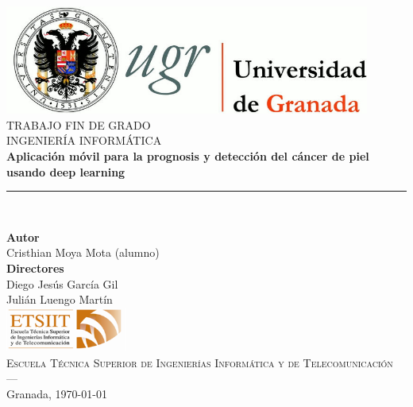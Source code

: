 \begin{titlepage}
 
\newlength{\centeroffset}
\setlength{\centeroffset}{-0.5\oddsidemargin}
\addtolength{\centeroffset}{0.5\evensidemargin}
\thispagestyle{empty}

\noindent\hspace*{\centeroffset}\begin{minipage}{\textwidth}

\centering
\includegraphics[width=0.9\textwidth]{imagenes/logo_ugr.jpg}\\[1.4cm]

\textsc{ \Large TRABAJO FIN DE GRADO\\[0.2cm]}
\textsc{ INGENIERÍA INFORMÁTICA}\\[1cm]
% 
{\Huge\bfseries Aplicación móvil para la prognosis y detección del cáncer de piel usando deep learning\\
}
\noindent\rule[-1ex]{\textwidth}{3pt}\\[3.5ex]
\end{minipage}

\vspace{1cm}
\noindent\hspace*{\centeroffset}\begin{minipage}{\textwidth}
\centering

\textbf{Autor}\\ {Cristhian Moya Mota (alumno)}\\[2ex]
\textbf{Directores}\\
Diego Jesús García Gil\\
Julián Luengo Martín\\
\vspace{2cm}
\includegraphics[width=0.3\textwidth]{imagenes/etsiit_logo.png}\\[0.1cm]
\textsc{Escuela Técnica Superior de Ingenierías Informática y de Telecomunicación}\\
\textsc{---}\\
Granada, \today
\end{minipage}
\end{titlepage}


